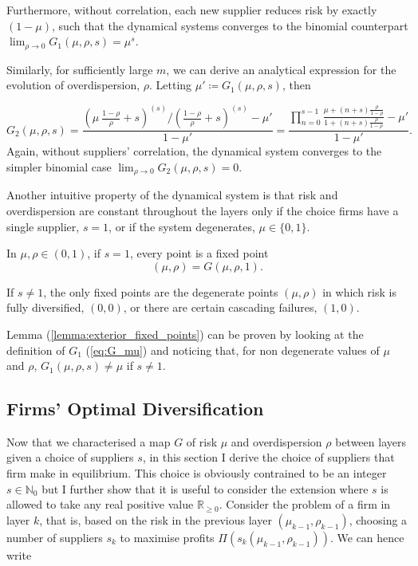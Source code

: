 \documentclass[../../main.tex]{subfiles}
\begin{document}
Furthermore, without correlation, each new supplier reduces risk by exactly $(1-\mu)$, such that the dynamical systems converges to the binomial counterpart $\lim_{\rho \rightarrow 0} G_1(\mu, \rho, s) = \mu^s$.

Similarly, for sufficiently large $m$, we can derive an analytical expression for the evolution of overdispersion, $\rho$. Letting $\mu' \coloneqq G_1(\mu, \rho, s)$, then

\begin{equation}
  G_2(\mu, \rho, s) = \frac{\left( \mu \  \frac{1 - \rho}{\rho} + s \right)^{(s)} \Big/ \left( \frac{1 - \rho}{\rho} + s \right)^{(s)} - \mu'}{1 - \mu'} = \frac{\prod^{s - 1}_{n = 0} \frac{\mu + (n + s) \frac{\rho}{1 - \rho}}{1 + (n + s) \frac{\rho}{1 - \rho}} - \mu'}{1 - \mu'}.
\end{equation} Again, without suppliers' correlation, the dynamical system converges to the simpler binomial case $\lim_{\rho \rightarrow 0} G_2(\mu, \rho, s) = 0$.

Another intuitive property of the dynamical system is that risk and overdispersion are constant throughout the layers only if the choice firms have a single supplier, $s = 1$, or if the system degenerates, $\mu \in \{0, 1\}$. 

\begin{lemma} \label{lemma:interior_fixed_points}
  In $\mu, \rho \in (0, 1)$, if $s = 1$, every point is a fixed point \begin{equation}
    (\mu, \rho) = G(\mu, \rho, 1). 
  \end{equation}
\end{lemma}

\begin{lemma} \label{lemma:exterior_fixed_points}
  If $s \neq 1$, the only fixed points are the degenerate points $(\mu, \rho)$ in which risk is fully diversified, $(0, 0)$, or there are certain cascading failures, $(1, 0)$.
\end{lemma}

Lemma (\ref{lemma:exterior_fixed_points}) can be proven by looking at the definition of $G_1$ (\ref{eq:G_mu}) and noticing that, for non degenerate values of $\mu$ and $\rho$, $G_1(\mu, \rho, s) \neq \mu$ if $s \neq 1$.

\subsection{Firms' Optimal Diversification}

Now that we characterised a map $G$ of risk $\mu$ and overdispersion $\rho$ between layers given a choice of suppliers $s$, in this section I derive the choice of suppliers that firm make in equilibrium. This choice is obviously contrained to be an integer $s \in \mathbb{N}_{0}$ but I further show that it is useful to consider the extension where $s$ is allowed to take any real positive value $\mathbb{R}_{\geq 0}$. Consider the problem of a firm in layer $k$, that is, based on the risk in the previous layer $(\mu_{k - 1}, \rho_{k - 1})$, choosing a number of suppliers $s_k$ to maximise profits $\Pi(s_k(\mu_{k - 1}, \rho_{k - 1}))$. We can hence write
\end{document}
